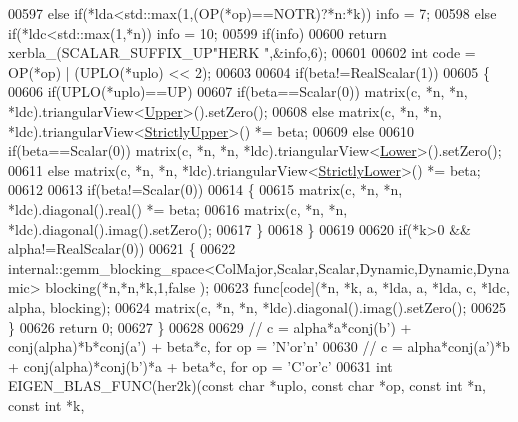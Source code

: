 \begin{DoxyCode}
00597   \textcolor{keywordflow}{else} \textcolor{keywordflow}{if}(*lda<std::max(1,(OP(*op)==NOTR)?*n:*k))                     info = 7;
00598   \textcolor{keywordflow}{else} \textcolor{keywordflow}{if}(*ldc<std::max(1,*n))                                        info = 10;
00599   \textcolor{keywordflow}{if}(info)
00600     \textcolor{keywordflow}{return} xerbla\_(SCALAR\_SUFFIX\_UP\textcolor{stringliteral}{"HERK "},&info,6);
00601 
00602   \textcolor{keywordtype}{int} code = OP(*op) | (UPLO(*uplo) << 2);
00603 
00604   \textcolor{keywordflow}{if}(beta!=RealScalar(1))
00605   \{
00606     \textcolor{keywordflow}{if}(UPLO(*uplo)==UP)
00607       \textcolor{keywordflow}{if}(beta==Scalar(0)) matrix(c, *n, *n, *ldc).triangularView<\hyperlink{group__enums_gga39e3366ff5554d731e7dc8bb642f83cda6bcb58be3b8b8ec84859ce0c5ac0aaec}{Upper}>().setZero();
00608       \textcolor{keywordflow}{else}                matrix(c, *n, *n, *ldc).triangularView<\hyperlink{group__enums_gga39e3366ff5554d731e7dc8bb642f83cdae38aad7d66fecfb213fce453edff4c7a}{StrictlyUpper}>() *= beta;
00609     \textcolor{keywordflow}{else}
00610       \textcolor{keywordflow}{if}(beta==Scalar(0)) matrix(c, *n, *n, *ldc).triangularView<\hyperlink{group__enums_gga39e3366ff5554d731e7dc8bb642f83cda891792b8ed394f7607ab16dd716f60e6}{Lower}>().setZero();
00611       \textcolor{keywordflow}{else}                matrix(c, *n, *n, *ldc).triangularView<\hyperlink{group__enums_gga39e3366ff5554d731e7dc8bb642f83cda00aa79c8865ada1584c4d57bcd93299f}{StrictlyLower}>() *= beta;
00612 
00613     \textcolor{keywordflow}{if}(beta!=Scalar(0))
00614     \{
00615       matrix(c, *n, *n, *ldc).diagonal().real() *= beta;
00616       matrix(c, *n, *n, *ldc).diagonal().imag().setZero();
00617     \}
00618   \}
00619 
00620   \textcolor{keywordflow}{if}(*k>0 && alpha!=RealScalar(0))
00621   \{
00622     internal::gemm\_blocking\_space<ColMajor,Scalar,Scalar,Dynamic,Dynamic,Dynamic> blocking(*n,*n,*k,1,\textcolor{keyword}{false}
      );
00623     func[code](*n, *k, a, *lda, a, *lda, c, *ldc, alpha, blocking);
00624     matrix(c, *n, *n, *ldc).diagonal().imag().setZero();
00625   \}
00626   \textcolor{keywordflow}{return} 0;
00627 \}
00628 
00629 \textcolor{comment}{// c = alpha*a*conj(b') + conj(alpha)*b*conj(a') + beta*c,  for op = 'N'or'n'}
00630 \textcolor{comment}{// c = alpha*conj(a')*b + conj(alpha)*conj(b')*a + beta*c,  for op = 'C'or'c'}
00631 \textcolor{keywordtype}{int} EIGEN\_BLAS\_FUNC(her2k)(\textcolor{keyword}{const} \textcolor{keywordtype}{char} *uplo, \textcolor{keyword}{const} \textcolor{keywordtype}{char} *op, \textcolor{keyword}{const} \textcolor{keywordtype}{int} *n, \textcolor{keyword}{const} \textcolor{keywordtype}{int} *k,

\end{DoxyCode}
